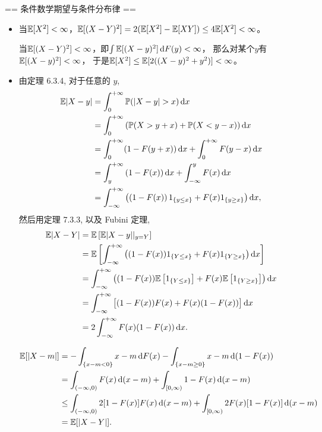 == 条件数学期望与条件分布律 ==
\begin{itemize}
    \item[7.1]
    当$\mathbb{E}[X^2]<\infty$，$\mathbb{E}[(X-Y)^2]=2(\mathbb{E}[X^2]-\mathbb{E}[XY])\le4\mathbb{E}[X^2]<\infty$。

    当$\mathbb{E}[(X-Y)^2]<\infty$，即$\int\mathbb{E}[(X-y)^2]\,{\rm d}F(y)<\infty$，
    那么对某个$y$有$\mathbb{E}[(X-y)^2]<\infty$，
    于是$\mathbb{E}[X^2]\le\mathbb{E}[2((X-y)^2+y^2)]<\infty$。

    \item[7.3]
    由定理 6.3.4, 对于任意的 $y$,
    \begin{align*}
        \mathbb{E}|X-y| &= \int_0^{+\infty} \mathbb{P} (|X-y| > x ) \,{\rm d}x \\
        &= \int_0^{+\infty} \left( \mathbb{P} (X > y+x) + \mathbb{P} (X < y-x) \right) {\rm d}x \\
        &= \int_0^{+\infty} (1 - F(y+x)) \,{\rm d}x + \int_0^{+\infty} F(y-x) \,{\rm d}x \\
        &= \int_y^{+\infty} \left( 1 - F(x) \right) {\rm d}x + \int_{-\infty}^y F(x) \,{\rm d}x \\
        &= \int_{-\infty}^{+\infty} \left( \left( 1 - F(x) \right) 1_{\{y \le x\}} + F(x) 1_{\{y \ge x\}} \right) \mathrm dx ,
    \end{align*}
    然后用定理 7.3.3, 以及 Fubini 定理,
    \begin{align*}
        \mathbb{E}|X-Y| &= \mathbb{E}\left[ \mathbb{E}|X-y| \middle| _{y=Y} \right] \\
        &= \mathbb{E}\left[ \int_{-\infty}^{+\infty} \left( (1 - F(x)) 1_{\{Y \le x\}} + F(x) 1_{\{Y \ge x\}} \right) {\rm d}x \right] \\
        &= \int_{-\infty}^{+\infty} \left( (1 - F(x)) \mathbb{E}\left[ 1_{\{Y \le x\}} \right] + F(x) \mathbb{E}\left[ 1_{\{Y \ge x\}} \right] \right) {\rm d}x \\
        &= \int_{-\infty}^{+\infty} \big[ (1 - F(x)) F(x) + F(x) (1 - F(x)) \big] \,{\rm d}x \\
        &= 2 \int_{-\infty}^{+\infty} F(x) (1 - F(x)) \,{\rm d}x.
    \end{align*}

    \begin{align*}
        \mathbb{E}[|X-m|]&=-\int_{\{x-m<0\}}x-m\,{\rm d}F(x)-\int_{\{x-m\ge0\}}x-m\,{\rm d}(1-F(x))\\
        &=\int_{(-\infty,0)} F(x)\,{\rm d}(x-m)+\int_{[0,\infty)} 1-F(x)\,{\rm d}(x-m)\\
        &\le\int_{(-\infty,0)} 2[1-F(x)]F(x)\,{\rm d}(x-m)
        +\int_{[0,\infty)} 2F(x)[1-F(x)]\,{\rm d}(x-m)\\
        &=\mathbb{E}[|X-Y|].
    \end{align*}


\end{itemize}

